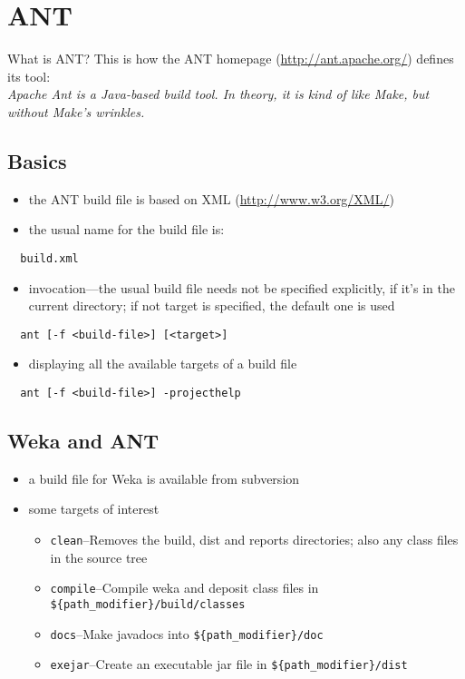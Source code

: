 
\section{ANT}

What is ANT? This is how the ANT homepage (\url{http://ant.apache.org/}{}) defines its tool:\\

\noindent \emph{Apache Ant is a Java-based build tool. In theory, it is kind of like Make, but without Make's wrinkles.}

\subsection{Basics}

\begin{itemize}
\item the ANT build file is based on XML (\url{http://www.w3.org/XML/}{})
\item the usual name for the build file is:
\end{itemize}

\verb=  build.xml=

\begin{itemize}
\item invocation---the usual build file needs not be specified explicitly, if it's in the current directory; if not target is specified, the default one is used
\end{itemize}

\verb=  ant [-f <build-file>] [<target>]=

\begin{itemize}
\item displaying all the available targets of a build file
\end{itemize}

\verb=  ant [-f <build-file>] -projecthelp=

\subsection{Weka and ANT}

\begin{itemize}
\item a build file for Weka is available from subversion
\item some targets of interest
  \begin{itemize}
  \item \verb=clean=--Removes the build, dist and reports directories; also any class files in the source tree
  \item \verb=compile=--Compile weka and deposit class files in\\ \verb=${path_modifier}/build/classes=
  \item \verb=docs=--Make javadocs into \verb=${path_modifier}/doc=
  \item \verb=exejar=--Create an executable jar file in \verb=${path_modifier}/dist=
  \end{itemize}
\end{itemize}

